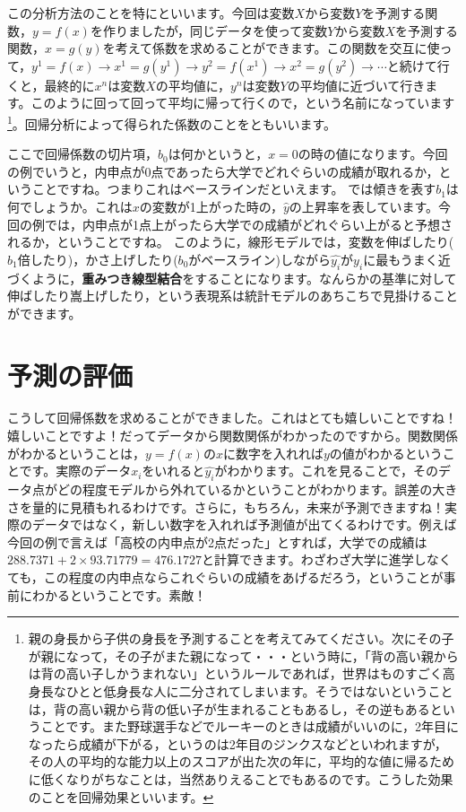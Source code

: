 \documentclass{ltjbook}
\begin{document}
この分析方法のことを特にといいます。今回は変数$X$から変数$Y$を予測する関数，$y=f(x)$を作りましたが，同じデータを使って変数$Y$から変数$X$を予測する関数，$x=g(y)$を考えて係数を求めることができます。この関数を交互に使って，$y^1 = f(x) \to x^1 = g(y^1) \to y^2 = f(x^1) \to x^2 = g(y^2) \to \cdots $と続けて行くと，最終的に$x^n$は変数$X$の平均値に，$y^n$は変数$Y$の平均値に近づいて行きます。このように回って回って平均に帰って行くので，という名前になっています\footnote{親の身長から子供の身長を予測することを考えてみてください。次にその子が親になって，その子がまた親になって・・・という時に，「背の高い親からは背の高い子しかうまれない」というルールであれば，世界はものすごく高身長なひとと低身長な人に二分されてしまいます。そうではないということは，背の高い親から背の低い子が生まれることもあるし，その逆もあるということです。また野球選手などでルーキーのときは成績がいいのに，2年目になったら成績が下がる，というのは2年目のジンクスなどといわれますが，その人の平均的な能力以上のスコアが出た次の年に，平均的な値に帰るために低くなりがちなことは，当然ありえることでもあるのです。こうした効果のことを回帰効果といいます。}。回帰分析によって得られた係数のことをともいいます。

ここで回帰係数の切片項，$b_0$は何かというと，$x=0$の時の値になります。今回の例でいうと，内申点が0点であったら大学でどれぐらいの成績が取れるか，ということですね。つまりこれはベースラインだといえます。
では傾きを表す$b_1$は何でしょうか。これは$x$の変数が1上がった時の，$\hat{y}$の上昇率を表しています。今回の例では，内申点が1点上がったら大学での成績がどれぐらい上がると予想されるか，ということですね。
このように，線形モデルでは，変数を伸ばしたり($b_1$倍したり)，かさ上げしたり($b_0$がベースライン)しながら$\hat{y_i}$が$y_i$に最もうまく近づくように，\textbf{重みつき線型結合}をすることになります。なんらかの基準に対して伸ばしたり嵩上げしたり，という表現系は統計モデルのあちこちで見掛けることができます。

\section{予測の評価}
こうして回帰係数を求めることができました。これはとても嬉しいことですね！嬉しいことですよ！だってデータから関数関係がわかったのですから。関数関係がわかるということは，$y=f(x)$の$x$に数字を入れれば$y$の値がわかるということです。実際のデータ$x_i$をいれると$\hat{y_i}$がわかります。これを見ることで，そのデータ点がどの程度モデルから外れているかということがわかります。誤差の大きさを量的に見積もれるわけです。さらに，もちろん，未来が予測できますね！実際のデータではなく，新しい数字を入れれば予測値が出てくるわけです。例えば今回の例で言えば「高校の内申点が2点だった」とすれば，大学での成績は$288.7371+2\times93.71779=476.1727$と計算できます。わざわざ大学に進学しなくても，この程度の内申点ならこれぐらいの成績をあげるだろう，ということが事前にわかるということです。素敵！
\end{document}
